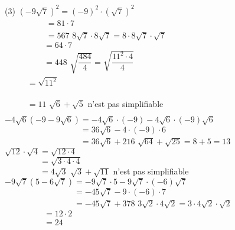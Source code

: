 \documentclass[a4paper,12pt]{report}
\begin{document}
\begin{cora}\phantom{ }

\begin{tasks}(3)
\task $\left(-9 \sqrt{7}\right)^{2}=(-9)^{2}\cdot \left(\sqrt{7}\right)^{2}$
                        $\phantom{\left(-9 \sqrt{7}\right)^{2}}$\\
                        $\phantom{\left(-9 \sqrt{7}\right)^{2}}=81\cdot 7$\\
                        $\phantom{\left(-9 \sqrt{7}\right)^{2}}=567$
\task $ 8 \sqrt{7}\cdot 8 \sqrt{7}=8\cdot 8 \sqrt{7} \cdot \sqrt{7}$\\
                        $\phantom{8 \sqrt{7}\cdot 8 \sqrt{7}}=64\cdot 7$\\
                        $\phantom{8 \sqrt{7}\cdot 8 \sqrt{7}}=448$
\task $ \sqrt{\dfrac{484}{4}}= \sqrt{\dfrac{11^{2}\cdot4}{4}}$\\
                        $\phantom{\sqrt{\dfrac{484}{4}}}=\sqrt{11^{2}}$\\
                        $\phantom{\sqrt{\dfrac{484}{4}}}=11$ 
\task $  \sqrt{6}+\sqrt{5}$ n'est pas simplifiable
\task $-4 \sqrt{6}\left( -9  -9\sqrt{6}\right)=
                        -4 \sqrt{6}\cdot (-9)-4 \sqrt{6}\cdot (-9)\sqrt{6}$\\
                        $\phantom{-4 \sqrt{6}\left( -9  -9\sqrt{6}\right)}=36\sqrt{6}-4\cdot (-9)\cdot 6$\\
                        $\phantom{-4 \sqrt{6}\left( -9  -9\sqrt{6}\right)}=36\sqrt{6}+216$
\task $  \sqrt{64}+\sqrt{25}=8+5=13$ 
\task $ \sqrt{12}\cdot \sqrt{4}=\sqrt{12\cdot4}$\\
                        $\phantom{\sqrt{12}\cdot \sqrt{4}}=\sqrt{3\cdot4\cdot4}$\\
                        $\phantom{\sqrt{12}\cdot \sqrt{4}}=4\sqrt{3}$ 
\task $  \sqrt{3}+\sqrt{11}$ n'est pas simplifiable
\task $-9 \sqrt{7}\left( 5  -6\sqrt{7}\right)=
                        -9 \sqrt{7}\cdot 5-9 \sqrt{7}\cdot (-6)\sqrt{7}$\\
                        $\phantom{-9 \sqrt{7}\left( 5  -6\sqrt{7}\right)}=-45\sqrt{7}-9\cdot (-6)\cdot 7$\\
                        $\phantom{-9 \sqrt{7}\left( 5  -6\sqrt{7}\right)}=-45\sqrt{7}+378$
\task $ 3 \sqrt{2}\cdot 4 \sqrt{2}=3\cdot 4 \sqrt{2} \cdot \sqrt{2}$\\
                        $\phantom{3 \sqrt{2}\cdot 4 \sqrt{2}}=12\cdot 2$\\
                        $\phantom{3 \sqrt{2}\cdot 4 \sqrt{2}}=24$
\end{tasks}

\end{cora}
\end{document}
